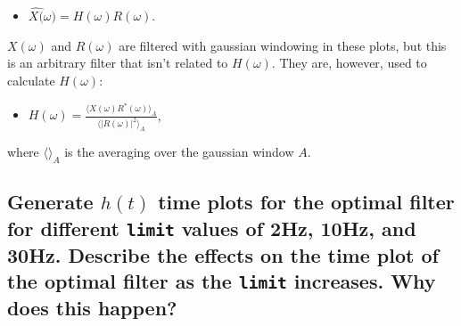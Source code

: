 \documentclass{article}
\begin{document}
\begin{itemize}
\itemsep1pt\parskip0pt
\item
  $\hat{X(}\omega) = H(\omega) R(\omega)$.
\end{itemize}

$X(\omega)$ and $R(\omega)$ are filtered with gaussian windowing in
these plots, but this is an arbitrary filter that isn't related to
$H(\omega)$. They are, however, used to calculate $H(\omega)$:

\begin{itemize}
\itemsep1pt\parskip0pt
\item
  $H(\omega)=\frac{\langle X(\omega) R^*(\omega) \rangle_A}{\langle |R(\omega)|^2\rangle_A}$,
\end{itemize}

where $\langle \rangle_A$ is the averaging over the gaussian window $A$.

\subsection{Generate $h(t)$ time plots for the optimal filter for
different \texttt{limit} values of 2Hz, 10Hz, and 30Hz. Describe the
effects on the time plot of the optimal filter as the \texttt{limit}
increases. Why does this
happen?}\label{e-generate-ht-time-plots-for-the-optimal-filter-for-different-limit-values-of-2hz-10hz-and-30hz.-describe-the-effects-on-the-time-plot-of-the-optimal-filter-as-the-limit-increases.-why-does-this-happen}
\end{document}
